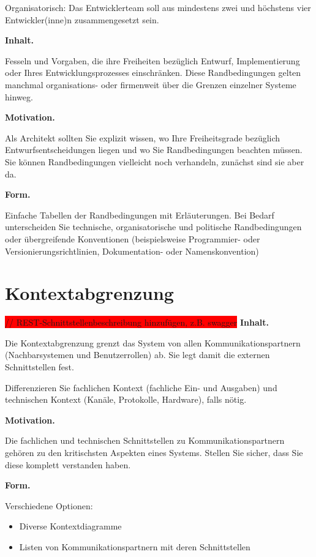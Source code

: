 \documentclass[]{article}
\begin{document}
Organisatorisch: Das Entwicklerteam soll aus mindestens zwei und höchstens vier Entwickler(inne)n zusammengesetzt sein.

\textbf{Inhalt.}

Fesseln und Vorgaben, die ihre Freiheiten bezüglich Entwurf,
Implementierung oder Ihres Entwicklungsprozesses einschränken. Diese
Randbedingungen gelten manchmal organisations- oder firmenweit über die
Grenzen einzelner Systeme hinweg.

\textbf{Motivation.}

Als Architekt sollten Sie explizit wissen, wo Ihre Freiheitsgrade
bezüglich Entwurfsentscheidungen liegen und wo Sie Randbedingungen
beachten müssen. Sie können Randbedingungen vielleicht noch verhandeln,
zunächst sind sie aber da.

\textbf{Form.}

Einfache Tabellen der Randbedingungen mit Erläuterungen. Bei Bedarf
unterscheiden Sie technische, organisatorische und politische
Randbedingungen oder übergreifende Konventionen (beispielsweise
Programmier- oder Versionierungsrichtlinien, Dokumentation- oder
Namenskonvention)

\section{Kontextabgrenzung}\label{section-system-scope-and-context}

\colorbox{red} {// REST-Schnittstellenbeschreibung hinzufügen, z.B. swagger}
\textbf{Inhalt.}

Die Kontextabgrenzung grenzt das System von allen Kommunikationspartnern
(Nachbarsystemen und Benutzerrollen) ab. Sie legt damit die externen
Schnittstellen fest.

Differenzieren Sie fachlichen Kontext (fachliche Ein- und Ausgaben) und
technischen Kontext (Kanäle, Protokolle, Hardware), falls nötig.

\textbf{Motivation.}

Die fachlichen und technischen Schnittstellen zu Kommunikationspartnern
gehören zu den kritischsten Aspekten eines Systems. Stellen Sie sicher,
dass Sie diese komplett verstanden haben.

\textbf{Form.}

Verschiedene Optionen:

\begin{itemize}
\item
  Diverse Kontextdiagramme
\item
  Listen von Kommunikationspartnern mit deren Schnittstellen
\end{itemize}
\end{document}
